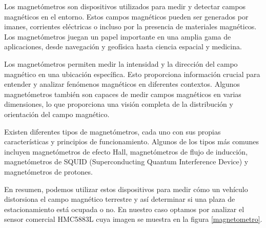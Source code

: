 Los magnetómetros son dispositivos utilizados para medir y detectar campos magnéticos en
el entorno. Estos campos magnéticos pueden ser generados por imanes, corrientes
eléctricas o incluso por la presencia de materiales magnéticos. Los magnetómetros juegan
un papel importante en una amplia gama de aplicaciones, desde navegación y geofísica
hasta ciencia espacial y medicina.

Los magnetómetros permiten medir la intensidad y la dirección del campo magnético en una
ubicación específica. Esto proporciona información crucial para entender y analizar
fenómenos magnéticos en diferentes contextos. Algunos magnetómetros también son capaces
de medir campos magnéticos en varias dimensiones, lo que proporciona una visión completa
de la distribución y orientación del campo magnético.


Existen diferentes tipos de magnetómetros, cada uno con sus propias características y
principios de funcionamiento. Algunos de los tipos más comunes incluyen magnetómetros de
efecto Hall, magnetómetros de flujo de inducción, magnetómetros de SQUID
(Superconducting Quantum Interference Device) y magnetómetros de protones.

En resumen, podemos utilizar estos dispositivos para medir cómo un vehículo distorsiona
el campo magnético terrestre y así determinar si una plaza de estacionamiento está
ocupada o no. En nuestro caso optamos por analizar el sensor comercial HMC5883L cuya imagen se muestra en la figura \ref{magnetometro}.

